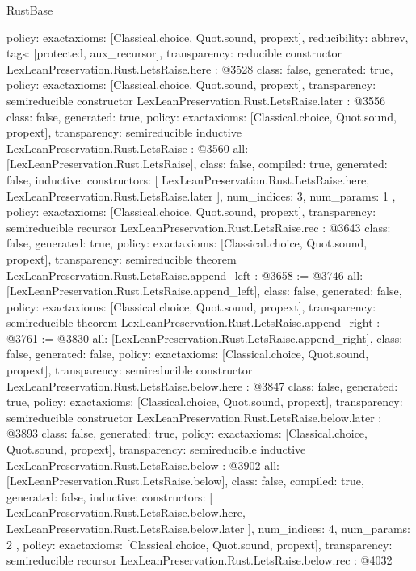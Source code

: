 \begin{lexlean}{RustBase}
\begin{coremodule}
{  policy: exact{axioms: [Classical.choice, Quot.sound, propext]},
  reducibility: abbrev{},
  tags: [protected, aux_recursor],
  transparency: reducible
}
constructor LexLeanPreservation.Rust.LetsRaise.here : @3528 {
  class: false,
  generated: true,
  policy: exact{axioms: [Classical.choice, Quot.sound, propext]},
  transparency: semireducible
}
constructor LexLeanPreservation.Rust.LetsRaise.later : @3556 {
  class: false,
  generated: true,
  policy: exact{axioms: [Classical.choice, Quot.sound, propext]},
  transparency: semireducible
}
inductive LexLeanPreservation.Rust.LetsRaise : @3560 {
  all: [LexLeanPreservation.Rust.LetsRaise],
  class: false,
  compiled: true,
  generated: false,
  inductive: {
    constructors: [
      LexLeanPreservation.Rust.LetsRaise.here,
      LexLeanPreservation.Rust.LetsRaise.later
    ],
    num_indices: 3,
    num_params: 1
  },
  policy: exact{axioms: [Classical.choice, Quot.sound, propext]},
  transparency: semireducible
}
recursor LexLeanPreservation.Rust.LetsRaise.rec : @3643 {
  class: false,
  generated: true,
  policy: exact{axioms: [Classical.choice, Quot.sound, propext]},
  transparency: semireducible
}
theorem LexLeanPreservation.Rust.LetsRaise.append_left : @3658 := @3746 {
  all: [LexLeanPreservation.Rust.LetsRaise.append_left],
  class: false,
  generated: false,
  policy: exact{axioms: [Classical.choice, Quot.sound, propext]},
  transparency: semireducible
}
theorem LexLeanPreservation.Rust.LetsRaise.append_right : @3761 := @3830 {
  all: [LexLeanPreservation.Rust.LetsRaise.append_right],
  class: false,
  generated: false,
  policy: exact{axioms: [Classical.choice, Quot.sound, propext]},
  transparency: semireducible
}
constructor LexLeanPreservation.Rust.LetsRaise.below.here : @3847 {
  class: false,
  generated: true,
  policy: exact{axioms: [Classical.choice, Quot.sound, propext]},
  transparency: semireducible
}
constructor LexLeanPreservation.Rust.LetsRaise.below.later : @3893 {
  class: false,
  generated: true,
  policy: exact{axioms: [Classical.choice, Quot.sound, propext]},
  transparency: semireducible
}
inductive LexLeanPreservation.Rust.LetsRaise.below : @3902 {
  all: [LexLeanPreservation.Rust.LetsRaise.below],
  class: false,
  compiled: true,
  generated: false,
  inductive: {
    constructors: [
      LexLeanPreservation.Rust.LetsRaise.below.here,
      LexLeanPreservation.Rust.LetsRaise.below.later
    ],
    num_indices: 4,
    num_params: 2
  },
  policy: exact{axioms: [Classical.choice, Quot.sound, propext]},
  transparency: semireducible
}
recursor LexLeanPreservation.Rust.LetsRaise.below.rec : @4032 {
}
\end{coremodule}
\end{lexlean}
